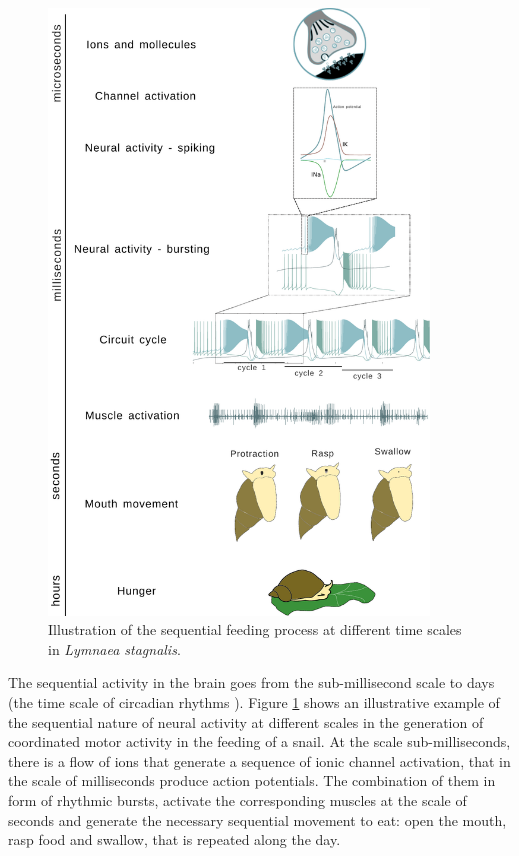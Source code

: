 \begin{figure}[hbt!]
	\centering
	\includegraphics[width=0.9\textwidth]{img/intro/time scale/time-scale-feeding.pdf}
	\caption{Illustration of the sequential feeding process at different time scales in {\sl Lymnaea stagnalis}.}
	\label{fig:time scale feeding}
\end{figure}

The sequential activity in the brain goes from the sub-millisecond scale to days (the time scale of circadian rhythms \parencite{mauk_neural_2004}). Figure \ref{fig:time scale feeding} shows an illustrative example of the sequential nature of neural activity at different scales in the generation of coordinated motor activity in the feeding of a snail. At the scale sub-milliseconds, there is a flow of ions that generate a sequence of ionic channel activation, that in the scale of milliseconds produce action potentials. The combination of them in form of rhythmic bursts, activate the corresponding muscles at the scale of seconds and generate the necessary sequential movement to eat: open the mouth, rasp food and swallow, that is repeated along the day. 


